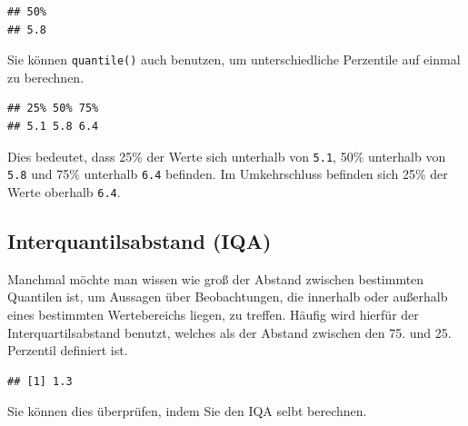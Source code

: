 \documentclass[
  ngerman,
]{book}
\newenvironment{Shaded}{\begin{snugshade}}{\end{snugshade}}
\newcommand{\CommentTok}[1]{\textcolor[rgb]{0.56,0.35,0.01}{\textit{#1}}}
\newcommand{\FloatTok}[1]{\textcolor[rgb]{0.00,0.00,0.81}{#1}}
\newcommand{\FunctionTok}[1]{\textcolor[rgb]{0.13,0.29,0.53}{\textbf{#1}}}
\newcommand{\NormalTok}[1]{#1}
\newcommand{\SpecialCharTok}[1]{\textcolor[rgb]{0.81,0.36,0.00}{\textbf{#1}}}
\begin{document}
\begin{verbatim}
## 50% 
## 5.8
\end{verbatim}

Sie können \texttt{quantile()} auch benutzen, um unterschiedliche Perzentile auf einmal zu berechnen.

\begin{Shaded}
\end{Shaded}

\begin{verbatim}
## 25% 50% 75% 
## 5.1 5.8 6.4
\end{verbatim}

Dies bedeutet, dass 25\% der Werte sich unterhalb von \texttt{5.1}, 50\% unterhalb von \texttt{5.8} und 75\% unterhalb \texttt{6.4} befinden. Im Umkehrschluss befinden sich 25\% der Werte oberhalb \texttt{6.4}.

\subsection{Interquantilsabstand (IQA)}\label{interquantilsabstand-iqa}

Manchmal möchte man wissen wie groß der Abstand zwischen bestimmten Quantilen ist,
um Aussagen über Beobachtungen, die innerhalb oder außerhalb eines bestimmten
Wertebereichs liegen, zu treffen. Häufig wird hierfür der Interquartilsabstand benutzt,
welches als der Abstand zwischen den 75. und 25. Perzentil definiert ist.

\begin{Shaded}
\end{Shaded}

\begin{verbatim}
## [1] 1.3
\end{verbatim}

Sie können dies überprüfen, indem Sie den IQA selbt berechnen.
\end{document}
